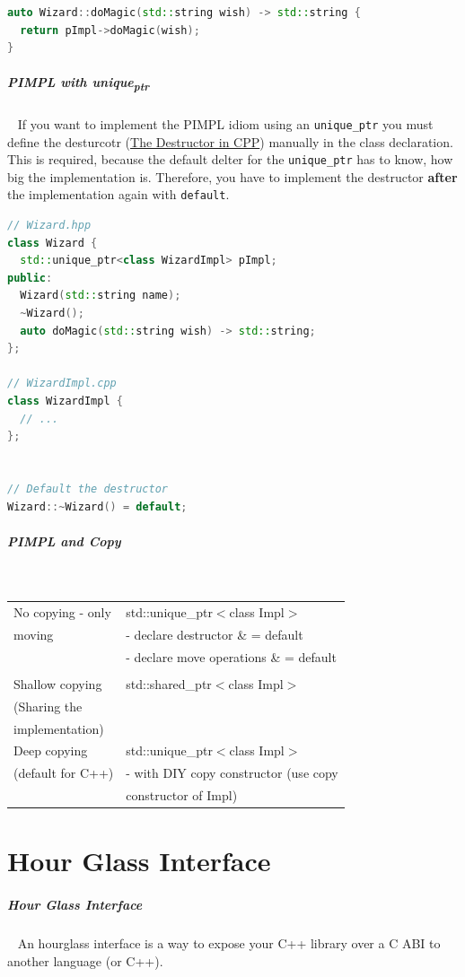 \documentclass[11pt,twoside,landscape]{article}
\begin{document}
\begin{multicols}{2}
\begin{lstlisting}[language=c++,caption={PIMPL example using shared\textsubscript{ptr}},captionpos=b,numbers=none]
auto Wizard::doMagic(std::string wish) -> std::string {
  return pImpl->doMagic(wish);
}
\end{lstlisting}

\subparagraph{PIMPL with unique\textsubscript{ptr}} \
\label{sec:org1053f0b}
If you want to implement the PIMPL idiom using an \texttt{unique\_ptr} you must define the desturcotr (\href{../../../roam/20211119155746-the_destructor_in_cpp.org}{The Destructor in CPP}) manually in the class declaration.
This is required, because the default delter for the \texttt{unique\_ptr} has to know, how big the implementation is.
Therefore, you have to implement the destructor \textbf{after} the implementation again with \texttt{default}.

\begin{lstlisting}[language=c++,label=lst:org462d1ab,caption={PIMPL using unique\textsubscript{ptr}},captionpos=b,numbers=none]
// Wizard.hpp
class Wizard {
  std::unique_ptr<class WizardImpl> pImpl;
public:
  Wizard(std::string name);
  ~Wizard();
  auto doMagic(std::string wish) -> std::string;
};

// WizardImpl.cpp
class WizardImpl {
  // ...
};


// Default the destructor
Wizard::~Wizard() = default;
\end{lstlisting}

\subparagraph{PIMPL and Copy} \
\label{sec:org0196883}
\begin{center}
\begin{tabular}{|l|l|}
\hline
No copying - only & std::unique\_ptr$<$class Impl$>$ \\
moving & - declare destructor \& = default \\
 & - declare move operations \& = default \\
 & \\
\hline
Shallow copying & std::shared\_ptr$<$class Impl$>$ \\
(Sharing the & \\
implementation) & \\
\hline
Deep copying & std::unique\_ptr$<$class Impl$>$ \\
(default for C++) & - with DIY copy constructor (use copy \\
 & constructor of Impl) \\
\hline
\end{tabular}
\end{center}

\section{Hour Glass Interface}
\label{sec:org915b553}
\subparagraph{Hour Glass Interface} \
\label{sec:org80c700e}
An hourglass interface is a way to expose your C++ library over a C ABI to another language (or C++).



\end{multicols}
\end{document}
